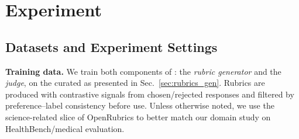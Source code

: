 \section{Experiment}








\subsection{Datasets and Experiment Settings}
\label{subsec:datasets-settings}

\noindent \textbf{Training data.}
We train both components of {\name}: the \emph{rubric generator} and the \emph{judge}, on the curated {\dataset} as presented in Sec.~\ref{sec:rubrics_gen}. Rubrics are produced with contrastive signals from chosen/rejected responses and filtered by preference–label consistency before use. Unless otherwise noted, we use the science-related slice of OpenRubrics to better match our domain study on HealthBench/medical evaluation.

